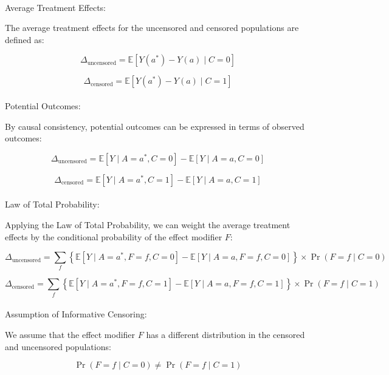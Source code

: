 \documentclass[
  single column]{article}
\makeatletter
\let\oldparagraph\paragraph
\renewcommand{\paragraph}{
    \@ifstar
      \xxxParagraphStar
      \xxxParagraphNoStar
  }
\newcommand{\xxxParagraphStar}[1]{\oldparagraph*{#1}\mbox{}}
\newcommand{\xxxParagraphNoStar}[1]{\oldparagraph{#1}\mbox{}}
\makeatother
\begin{document}
\paragraph{Average Treatment Effects:}\label{average-treatment-effects}

The average treatment effects for the uncensored and censored
populations are defined as:

\[
\Delta_{\text{uncensored}} = \mathbb{E}[Y(a^*) - Y(a) \mid C = 0]
\]

\[
\Delta_{\text{censored}} = \mathbb{E}[Y(a^*) - Y(a) \mid C = 1]
\]

\paragraph{Potential Outcomes:}\label{potential-outcomes}

By causal consistency, potential outcomes can be expressed in terms of
observed outcomes:

\[
\Delta_{\text{uncensored}} = \mathbb{E}[Y \mid A=a^*, C=0] - \mathbb{E}[Y \mid A=a, C=0]
\]

\[
\Delta_{\text{censored}} = \mathbb{E}[Y \mid A=a^*, C=1] - \mathbb{E}[Y \mid A=a, C=1]
\]

\paragraph{Law of Total Probability:}\label{law-of-total-probability}

Applying the Law of Total Probability, we can weight the average
treatment effects by the conditional probability of the effect modifier
\(F\):

\[
\Delta_{\text{uncensored}} = \sum_{f} \left\{\mathbb{E}[Y \mid A=a^*, F=f, C=0] - \mathbb{E}[Y \mid A=a, F=f, C=0]\right\} \times \Pr(F=f \mid C=0)
\]

\[
\Delta_{\text{censored}} = \sum_{f} \left\{\mathbb{E}[Y \mid A=a^*, F=f, C=1] - \mathbb{E}[Y \mid A=a, F=f, C=1]\right\} \times \Pr(F=f \mid C=1)
\]

\paragraph{Assumption of Informative
Censoring:}\label{assumption-of-informative-censoring}

We assume that the effect modifier \(F\) has a different distribution in
the censored and uncensored populations:

\[
\Pr(F=f \mid C=0) \neq \Pr(F=f \mid C=1)
\]
\end{document}

